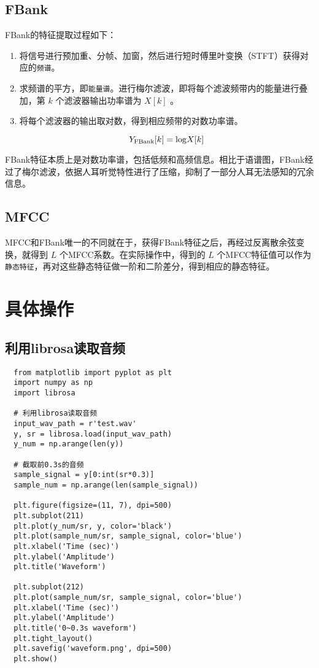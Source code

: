 \documentclass[cn,10pt,math=newtx,citestyle=gb7714-2015,bibstyle=gb7714-2015]{elegantbook}
\begin{document}
\subsection{FBank}

FBank的特征提取过程如下：

\begin{enumerate}
  \item 将信号进行预加重、分帧、加窗，然后进行短时傅里叶变换（STFT）获得对应的\lstinline{频谱}。
  \item 求频谱的平方，即\lstinline{能量谱}。进行梅尔滤波，即将每个滤波频带内的能量进行叠加，第 $k$ 个滤波器输出功率谱为 $X[k]$ 。
  \item 将每个滤波器的输出取对数，得到相应频带的对数功率谱。
  
  \begin{equation}
    Y_{\rm FBank}[k]={\rm log}X[k]
  \end{equation}
\end{enumerate}

FBank特征本质上是对数功率谱，包括低频和高频信息。相比于语谱图，FBank经过了梅尔滤波，依据人耳听觉特性进行了压缩，抑制了一部分人耳无法感知的冗余信息。

\subsection{MFCC}

MFCC和FBank唯一的不同就在于，获得FBank特征之后，再经过反离散余弦变换，就得到 $L$ 个MFCC系数。在实际操作中，得到的 $L$ 个MFCC特征值可以作为\lstinline{静态特征}，再对这些静态特征做一阶和二阶差分，得到相应的静态特征。

\section{具体操作}

\subsection{利用librosa读取音频}

\begin{lstlisting}
  from matplotlib import pyplot as plt
  import numpy as np
  import librosa

  # 利用librosa读取音频
  input_wav_path = r'test.wav'
  y, sr = librosa.load(input_wav_path)
  y_num = np.arange(len(y))
  
  # 截取前0.3s的音频
  sample_signal = y[0:int(sr*0.3)]
  sample_num = np.arange(len(sample_signal))
  
  plt.figure(figsize=(11, 7), dpi=500)
  plt.subplot(211)
  plt.plot(y_num/sr, y, color='black')
  plt.plot(sample_num/sr, sample_signal, color='blue')
  plt.xlabel('Time (sec)')
  plt.ylabel('Amplitude')
  plt.title('Waveform')
  
  plt.subplot(212)
  plt.plot(sample_num/sr, sample_signal, color='blue')
  plt.xlabel('Time (sec)')
  plt.ylabel('Amplitude')
  plt.title('0~0.3s waveform')
  plt.tight_layout()
  plt.savefig('waveform.png', dpi=500)
  plt.show()
\end{lstlisting}
\end{document}
